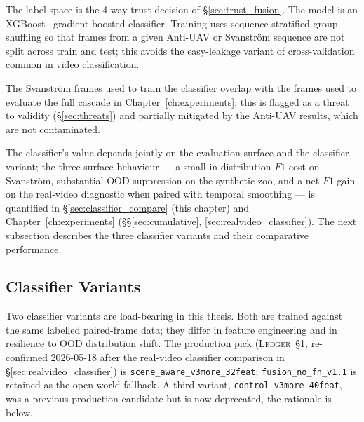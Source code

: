\documentclass[12pt,a4paper,oneside,openright]{book}
\begin{document}
The label space is the 4-way trust decision of \S\ref{sec:trust_fusion}. The model is an XGBoost~\cite{chen2016xgboost} gradient-boosted classifier. Training uses sequence-stratified group shuffling so that frames from a given Anti-UAV or Svanstr\"om sequence are not split across train and test; this avoids the easy-leakage variant of cross-validation common in video classification.

The Svanstr\"om frames used to train the classifier overlap with the frames used to evaluate the full cascade in Chapter~\ref{ch:experiments}; this is flagged as a threat to validity (\S\ref{sec:threats}) and partially mitigated by the Anti-UAV results, which are not contaminated.

The classifier's value depends jointly on the evaluation surface and the classifier variant; the three-surface behaviour --- a small in-distribution $F1$ cost on Svanstr\"om, substantial OOD-suppression on the synthetic zoo, and a net $F1$ gain on the real-video diagnostic when paired with temporal smoothing --- is quantified in \S\ref{sec:classifier_compare} (this chapter) and Chapter~\ref{ch:experiments} (\S\S\ref{sec:cumulative}, \ref{sec:realvideo_classifier}). The next subsection describes the three classifier variants and their comparative performance.

\subsection{Classifier Variants}
\label{sec:classifier_variants}

Two classifier variants are load-bearing in this thesis. Both are trained against the same labelled paired-frame data; they differ in feature engineering and in resilience to OOD distribution shift. The production pick (\textsc{Ledger}~\S1, re-confirmed 2026-05-18 after the real-video classifier comparison in \S\ref{sec:realvideo_classifier}) is \texttt{scene\_aware\_v3more\_32feat}; \texttt{fusion\_no\_fn\_v1.1} is retained as the open-world fallback. A third variant, \texttt{control\_v3more\_40feat}, was a previous production candidate but is now deprecated, the rationale is below.
\end{document}
